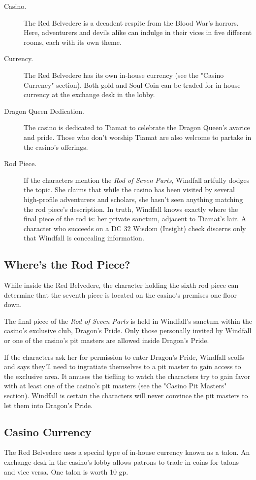 \documentclass[10pt,a4paper,twoside,bg=print,twocolumn,openany,nodeprecatedcode]{dndbook}
\begin{document}
\begin{description}
\item[Casino.]
The Red Belvedere is a decadent respite from the Blood War's horrors. Here, adventurers and devils alike can indulge in their vices in five different rooms, each with its own theme.
\item[Currency.]
The Red Belvedere has its own in-house currency (see the "Casino Currency" section). Both gold and Soul Coin can be traded for in-house currency at the exchange desk in the lobby.
\item[Dragon Queen Dedication.]
The casino is dedicated to Tiamat to celebrate the Dragon Queen's avarice and pride. Those who don't worship Tiamat are also welcome to partake in the casino's offerings.
\item[Rod Piece.]
If the characters mention the \textit{Rod of Seven Parts}, Windfall artfully dodges the topic. She claims that while the casino has been visited by several high-profile adventurers and scholars, she hasn't seen anything matching the rod piece's description. In truth, Windfall knows exactly where the final piece of the rod is: her private sanctum, adjacent to Tiamat's lair. A character who succeeds on a DC 32 Wisdom (Insight) check discerns only that Windfall is concealing information.
\end{description}

\subsection{Where's the Rod Piece?}
While inside the Red Belvedere, the character holding the sixth rod piece can determine that the seventh piece is located on the casino's premises one floor down.

The final piece of the \textit{Rod of Seven Parts} is held in Windfall's sanctum within the casino's exclusive club, Dragon's Pride. Only those personally invited by Windfall or one of the casino's pit masters are allowed inside Dragon's Pride.

If the characters ask her for permission to enter Dragon's Pride, Windfall scoffs and says they'll need to ingratiate themselves to a pit master to gain access to the exclusive area. It amuses the tiefling to watch the characters try to gain favor with at least one of the casino's pit masters (see the "Casino Pit Masters" section). Windfall is certain the characters will never convince the pit masters to let them into Dragon's Pride.

\subsection{Casino Currency}
The Red Belvedere uses a special type of in-house currency known as a talon. An exchange desk in the casino's lobby allows patrons to trade in coins for talons and vice versa. One talon is worth 10 gp.
\end{document}

